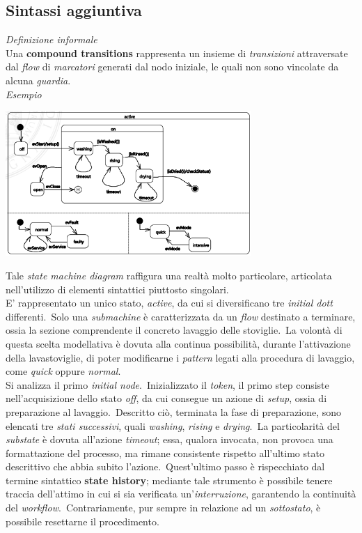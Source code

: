 \documentclass{article}
\begin{document}
\subsection*{Sintassi aggiuntiva}
\large
\textit{Definizione informale}\\Una \textbf{compound transitions} rappresenta un insieme di \textit{transizioni} attraversate dal \textit{flow} di \textit{marcatori} generati dal nodo iniziale, le quali non sono vincolate da alcuna \textit{guardia}.\vspace*{14pt}\\
\textit{Esempio}\vspace*{7pt}
\begin{center}
    \includegraphics*[width=0.7\textwidth]{foto 5.png}
\end{center}
Tale \textit{state machine diagram} raffigura una realtà molto particolare, articolata nell'utilizzo di elementi sintattici piuttosto singolari.\vspace*{14pt}\\
E' rappresentato un unico stato, \textit{active}, da cui si diversificano tre \textit{initial dott} differenti.\ Solo una \textit{submachine} è caratterizzata da un \textit{flow} destinato a terminare, ossia la sezione comprendente il concreto lavaggio delle stoviglie.\ La volontà di questa scelta modellativa è dovuta alla continua possibilità, durante l'attivazione della lavastoviglie, di poter modificarne i \textit{pattern} legati alla procedura di lavaggio, come \textit{quick} oppure \textit{normal}.\vspace*{14pt}\\
Si analizza il primo \textit{initial node}.\ Inizializzato il \textit{token}, il primo step consiste nell'acquisizione dello stato \textit{off}, da cui consegue un azione di \textit{setup}, ossia di preparazione al lavaggio.\ Descritto ciò, terminata la fase di preparazione, sono elencati tre \textit{stati successivi}, quali \textit{washing}, \textit{rising} e \textit{drying}.\ La particolarità del \textit{substate} è dovuta all'azione \textit{timeout}; essa, qualora invocata, non provoca una formattazione del processo, ma rimane consistente rispetto all'ultimo stato descrittivo che abbia subito l'azione.\ Quest'ultimo passo è rispecchiato dal termine sintattico \textbf{state history}; mediante tale strumento è possibile tenere traccia dell'attimo in cui si sia verificata un'\textit{interruzione}, garantendo la continuità del \textit{workflow}.\ Contrariamente, pur sempre in relazione ad un \textit{sottostato}, è possibile resettarne il procedimento.\vspace*{14pt}\\
\end{document}
